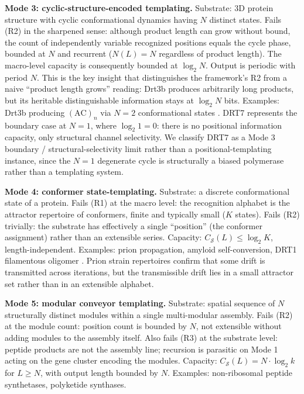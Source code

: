 \documentclass[aps,prx,reprint,amsmath,amssymb,floatfix,superscriptaddress,nofootinbib]{revtex4-2}
\theoremstyle{plain-thm}
\theoremstyle{definition-thm}
\newcommand{\Csub}{C_{\mathcal{S}}}
\begin{document}
\textbf{Mode 3: cyclic-structure-encoded templating.} Substrate: 3D protein structure with cyclic conformational dynamics having $N$ distinct states. Fails (R2) in the sharpened sense: although product length can grow without bound, the count of independently variable recognized positions equals the cycle phase, bounded at $N$ and recurrent ($N(L) = N$ regardless of product length). The macro-level capacity is consequently bounded at $\log_2 N$. Output is periodic with period $N$. This is the key insight that distinguishes the framework's R2 from a naive ``product length grows'' reading: Drt3b produces arbitrarily long products, but its heritable distinguishable information stays at $\log_2 N$ bits. Examples: Drt3b producing $(\mathrm{AC})_n$ via $N=2$ conformational states \citep{Deng2026}. DRT7 represents the boundary case at $N=1$, where $\log_2 1 = 0$: there is no positional information capacity, only structural channel selectivity. We classify DRT7 as a Mode 3 boundary / structural-selectivity limit rather than a positional-templating instance, since the $N=1$ degenerate cycle is structurally a biased polymerase rather than a templating system.

\textbf{Mode 4: conformer state-templating.} Substrate: a discrete conformational state of a protein. Fails (R1) at the macro level: the recognition alphabet is the attractor repertoire of conformers, finite and typically small ($K$ states). Fails (R2) trivially: the substrate has effectively a single ``position'' (the conformer assignment) rather than an extensible series. Capacity: $\Csub(L) \le \log_2 K$, length-independent. Examples: prion propagation, amyloid self-conversion, DRT1 filamentous oligomer \citep{DRT1preprint2026}. Prion strain repertoires confirm that some drift is transmitted across iterations, but the transmissible drift lies in a small attractor set rather than in an extensible alphabet.

\textbf{Mode 5: modular conveyor templating.} Substrate: spatial sequence of $N$ structurally distinct modules within a single multi-modular assembly. Fails (R2) at the module count: position count is bounded by $N$, not extensible without adding modules to the assembly itself. Also fails (R3) at the substrate level: peptide products are not the assembly line; recursion is parasitic on Mode 1 acting on the gene cluster encoding the modules. Capacity: $\Csub(L) = N \cdot \log_2 k$ for $L \ge N$, with output length bounded by $N$. Examples: non-ribosomal peptide synthetases, polyketide synthases.
\end{document}

